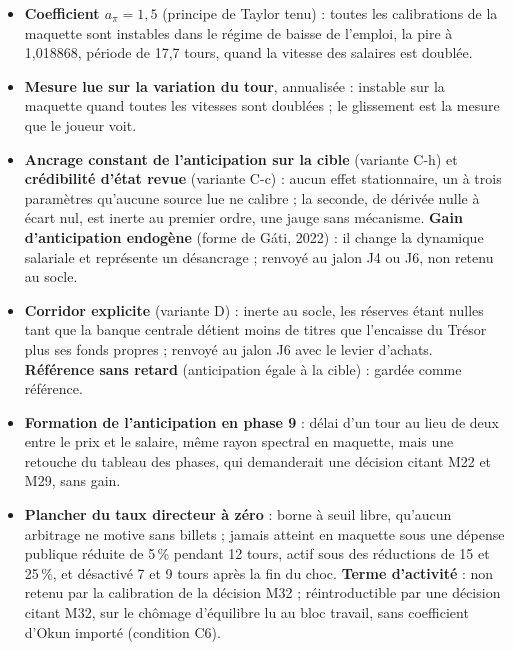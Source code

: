 \documentclass[11pt,a4paper]{article}
\begin{document}
\begin{itemize}
\item \textbf{Coefficient $a_\pi = 1{,}5$} (principe de Taylor tenu) : toutes les calibrations de la maquette sont instables dans le régime de baisse de l'emploi, la pire à 1,018868, période de 17,7 tours, quand la vitesse des salaires est doublée.
\item \textbf{Mesure lue sur la variation du tour}, annualisée : instable sur la maquette quand toutes les vitesses sont doublées ; le glissement est la mesure que le joueur voit.
\item \textbf{Ancrage constant de l'anticipation sur la cible} (variante C-h) et \textbf{crédibilité d'état revue} (variante C-c) : aucun effet stationnaire, un à trois paramètres qu'aucune source lue ne calibre ; la seconde, de dérivée nulle à écart nul, est inerte au premier ordre, une jauge sans mécanisme. \textbf{Gain d'anticipation endogène} (forme de Gáti, 2022) : il change la dynamique salariale et représente un désancrage ; renvoyé au jalon J4 ou J6, non retenu au socle.
\item \textbf{Corridor explicite} (variante D) : inerte au socle, les réserves étant nulles tant que la banque centrale détient moins de titres que l'encaisse du Trésor plus ses fonds propres ; renvoyé au jalon J6 avec le levier d'achats. \textbf{Référence sans retard} (anticipation égale à la cible) : gardée comme référence.
\item \textbf{Formation de l'anticipation en phase 9} : délai d'un tour au lieu de deux entre le prix et le salaire, même rayon spectral en maquette, mais une retouche du tableau des phases, qui demanderait une décision citant M22 et M29, sans gain.
\item \textbf{Plancher du taux directeur à zéro} : borne à seuil libre, qu'aucun arbitrage ne motive sans billets ; jamais atteint en maquette sous une dépense publique réduite de 5\,\% pendant 12 tours, actif sous des réductions de 15 et 25\,\%, et désactivé 7 et 9 tours après la fin du choc. \textbf{Terme d'activité} : non retenu par la calibration de la décision M32 ; réintroductible par une décision citant M32, sur le chômage d'équilibre lu au bloc travail, sans coefficient d'Okun importé (condition C6).
\end{itemize}
\end{document}
